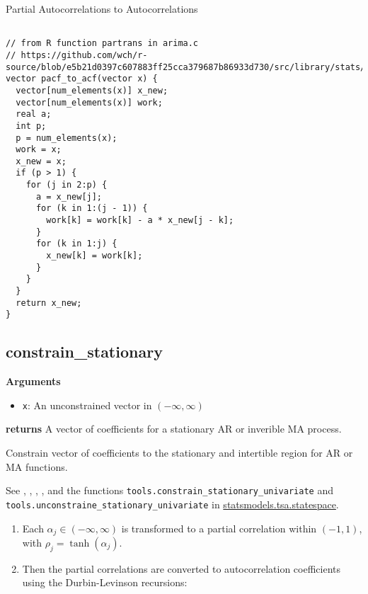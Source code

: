 \documentclass[]{book}
\providecommand{\tightlist}{%
  \setlength{\itemsep}{0pt}\setlength{\parskip}{0pt}}
\begin{document}
Partial Autocorrelations to Autocorrelations

\begin{verbatim}

// from R function partrans in arima.c
// https://github.com/wch/r-source/blob/e5b21d0397c607883ff25cca379687b86933d730/src/library/stats/src/arima.c#L439
vector pacf_to_acf(vector x) {
  vector[num_elements(x)] x_new;
  vector[num_elements(x)] work;
  real a;
  int p;
  p = num_elements(x);
  work = x;
  x_new = x;
  if (p > 1) {
    for (j in 2:p) {
      a = x_new[j];
      for (k in 1:(j - 1)) {
        work[k] = work[k] - a * x_new[j - k];
      }
      for (k in 1:j) {
        x_new[k] = work[k];
      }
    }
  }
  return x_new;
}

\end{verbatim}

\subsection{constrain\_stationary}\label{constrain_stationary}

\textbf{Arguments}

\begin{itemize}
\tightlist
\item
  \texttt{x}: An unconstrained vector in \((-\infty, \infty)\)
\end{itemize}

\textbf{returns} A vector of coefficients for a stationary AR or
inverible MA process.

Constrain vector of coefficients to the stationary and intertible region
for AR or MA functions.

See \textcite{Jones1980a}, \textcite{Jones1987a},
\textcite{Monahan1984a}, \textcite{AnsleyKohn1986a}, and the functions
\texttt{tools.constrain\_stationary\_univariate} and
\texttt{tools.unconstraine\_stationary\_univariate} in
\href{http://www.statsmodels.org/dev/statespace.html\#statespace-tools}{statsmodels.tsa.statespace}.

\begin{enumerate}
\def\labelenumi{\arabic{enumi}.}
\tightlist
\item
  Each \(\alpha_j \in (-\infty, \infty)\) is transformed to a partial
  correlation within \((-1, 1)\), with \(\rho_j = \tanh(\alpha_j)\).
\item
  Then the partial correlations are converted to autocorrelation
  coefficients using the Durbin-Levinson recursions: \[
     \]
\end{enumerate}
\end{document}
